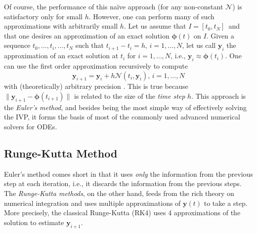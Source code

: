 Of course, the performance of this naïve approach (for any non-constant $\mathcal{N}$) is satisfactory only for small $h$.
However, one can perform many of such approximations with arbitrarily small $h$.
Let us assume that $I=\left[ t_0,t_N \right]$\footnotemark\, and that one desires an approximation of an exact solution $\bm{\phi}\left( t \right) $ on $I$.
Given a sequence $t_0,\ldots,t_i,\ldots,t_N$ such that $t_{i+1}-t_i=h,\,i=1,\ldots,N$, let us call $\bm{y}_{i}$ the approximation of an exact solution at $t_i$ for $i=1,\ldots,N$, i.e., $\bm{y}_{i}\approx \bm{\phi}(t_i)$.
One can use the first order approximation recursively to compute \[
\bm{y}_{i+1} = \bm{y}_{i} + h\mathcal{N}\left( t_i, \bm{y}_i \right),\,i=1,\ldots,N
\] with (theoretically) arbitrary precision \cite{iserles_first_2008}.
This is true because $\|\bm{y}_{i+1}-\bm{\phi}(t_{i+1})\|$ is related to the size of the \textit{time step} $h$.
This approach is the \emph{Euler's method}, and besides being the most simple way of effectively solving the \gls{IVP}, it forms the basis of most of the commonly used advanced numerical solvers for \gls{ODE}s.

\subsection{Runge-Kutta Method}

Euler's method comes short in that it uses \emph{only} the information from the previous step at each iteration, i.e., it discards the information from the previous steps.
The \emph{Runge-Kutta methods}, on the other hand, feeds from the rich theory on numerical integration and uses multiple approximations of $\bm{y}\left( t \right)$ to take a step.
More precisely, the classical Runge-Kutta (RK4) uses 4 approximations of the solution to estimate $\bm{y}_{i+1}$.

